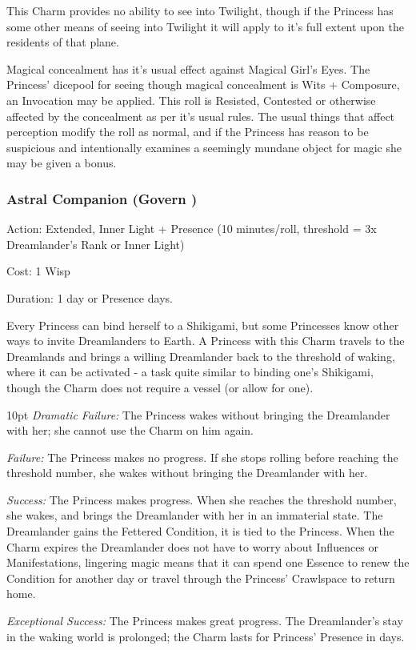 This Charm provides no ability to see into Twilight, though if the Princess has some other means of seeing into Twilight it will apply to it's full extent upon the residents of that plane. 

Magical concealment has it's usual effect against Magical Girl's Eyes. The Princess' dicepool for seeing though magical concealment is Wits + Composure, an Invocation may be applied. This roll is Resisted, Contested or otherwise affected by the concealment as per it's usual rules. The usual things that affect perception modify the roll as normal, and if the Princess has reason to be suspicious and intentionally examines a seemingly mundane object for magic she may be given a bonus.

\subsubsection*{Astral Companion (Govern \textbullet\textbullet\textbullet)}

\noindent Action: Extended, Inner Light + Presence (10 minutes/roll, threshold = 3x Dreamlander's Rank or Inner Light)

\noindent Cost: 1 Wisp

\noindent Duration: 1 day or Presence days.

Every Princess can bind herself to a Shikigami, but some Princesses know other ways to invite Dreamlanders to Earth. A Princess with this Charm travels to the Dreamlands and brings a willing Dreamlander back to the threshold of waking, where it can be activated - a task quite similar to binding one's Shikigami, though the Charm does not require a vessel (or allow for one).

\begin{myindentpar}{10pt}    \emph{Dramatic Failure:} The Princess wakes without bringing the Dreamlander with her; she cannot use the Charm on him again.

    \emph{Failure:} The Princess makes no progress. If she stops rolling before reaching the threshold number, she wakes without bringing the Dreamlander with her.

    \emph{Success:} The Princess makes progress. When she reaches the threshold number, she wakes, and brings the Dreamlander with her in an immaterial state. The Dreamlander gains the Fettered Condition, it is tied to the Princess. When the Charm expires the Dreamlander does not have to worry about Influences or Manifestations, lingering magic means that it can spend one Essence to renew the Condition for another day or travel through the Princess' Crawlspace to return home. 

    \emph{Exceptional Success:} The Princess makes great progress. The Dreamlander's stay in the waking world is prolonged; the Charm lasts for Princess' Presence in days.\end{myindentpar}

